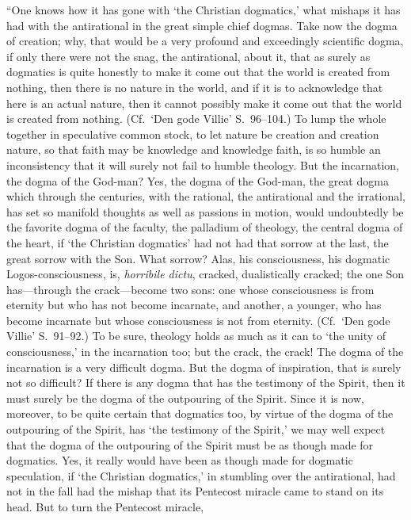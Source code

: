 \documentclass[12pt]{book}
\newcommand{\opage}[1]{\marginnote{\footnotesize\textit{[#1]}}}
\begin{document}
``One knows how it has gone with `the Christian dogmatics,' what
mishaps it has had with the antirational in the great simple chief
dogmas. Take now the dogma of creation; why, that would be a very
profound and exceedingly scientific dogma, if only there were not the
snag, the antirational, about it, that as surely as dogmatics is quite
honestly to make it come out that the world is created from nothing,
then there is no nature in the world, and if it is to acknowledge that
here is an actual nature, then it cannot possibly make it come out that
the world is created from nothing. (Cf.\ `Den gode Villie' S.~96--104.)
To lump the whole together in speculative common stock, to let nature
be creation and creation nature, so that faith may be knowledge and
knowledge faith, is so humble an inconsistency that it will surely not
fail to humble theology. But the incarnation, the dogma of the God-man?
Yes, the dogma of the God-man, the great dogma which through the
centuries, with the rational, the antirational and the irrational, has
set so manifold thoughts as well as passions in motion, would
undoubtedly be the favorite dogma of the faculty, the palladium of
theology, the central dogma of the heart, if `the Christian
\opage{240}\setcounter{footnote}{0}%
dogmatics' had not had that sorrow at the last, the great sorrow with
the Son. What sorrow? Alas, his consciousness, his dogmatic
Logos-consciousness, is, \textit{horribile dictu}, cracked, dualistically
cracked; the one Son has---through the crack---become two sons: one
whose consciousness is from eternity but who has not become incarnate,
and another, a younger, who has become incarnate but whose
consciousness is not from eternity. (Cf.\ `Den gode Villie'
S.~91--92.) To be sure, theology holds as much as it can to `the unity
of consciousness,' in the incarnation too; but the crack, the crack!
The dogma of the incarnation is a very difficult dogma. But the dogma
of inspiration, that is surely not so difficult? If there is any dogma
that has the testimony of the Spirit, then it must surely be the dogma
of the outpouring of the Spirit. Since it is now, moreover, to be quite
certain that dogmatics too, by virtue of the dogma of the outpouring of
the Spirit, has `the testimony of the Spirit,' we may well expect that
the dogma of the outpouring of the Spirit must be as though made for
dogmatics. Yes, it really would have been as though made for dogmatic
speculation, if `the Christian dogmatics,' in stumbling over the
antirational, had not in the fall had the mishap that its Pentecost
miracle came to stand on its head. But to turn the Pentecost miracle,
\end{document}
